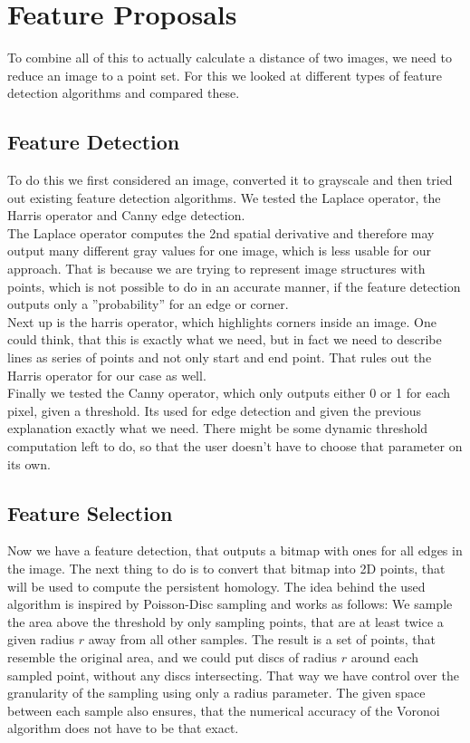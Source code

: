 \documentclass[11pt, a4paper, UKenglish]{article}
\begin{document}
    \section{Feature Proposals}\label{sec:feature-proposals2}
    To combine all of this to actually calculate a distance of two images, we need to reduce an image to a point set.
    For this we looked at different types of feature detection algorithms and compared these.
    \subsection{Feature Detection}\label{subsec:feature-detection}
    To do this we first considered an image, converted it to grayscale and then tried out existing feature detection algorithms.
    We tested the Laplace operator, the Harris operator and Canny edge detection.\\
    The Laplace operator computes the 2nd spatial derivative and therefore may output many different gray values for one image, which is less usable for our approach.
    That is because we are trying to represent image structures with points, which is not possible to do in an accurate manner, if the feature detection outputs only a ''probability'' for an edge or corner.\\
    Next up is the harris operator, which highlights corners inside an image.
    One could think, that this is exactly what we need, but in fact we need to describe lines as series of points and not only start and end point.
    That rules out the Harris operator for our case as well.\\
    Finally we tested the Canny operator, which only outputs either 0 or 1 for each pixel, given a threshold.
    Its used for edge detection and given the previous explanation exactly what we need.
    There might be some dynamic threshold computation left to do, so that the user doesn't have to choose that parameter on its own.
    \subsection{Feature Selection}\label{subsec:feature-selection}
    Now we have a feature detection, that outputs a bitmap with ones for all edges in the image.
    The next thing to do is to convert that bitmap into 2D points, that will be used to compute the persistent homology.
    The idea behind the used algorithm is inspired by Poisson-Disc sampling and works as follows:
    We sample the area above the threshold by only sampling points, that are at least twice a given radius $r$ away from all other samples.
    The result is a set of points, that resemble the original area, and we could put discs of radius $r$ around each sampled point, without any discs intersecting.
    That way we have control over the granularity of the sampling using only a radius parameter.
    The given space between each sample also ensures, that the numerical accuracy of the Voronoi algorithm does not have to be that exact.
    
\end{document}
